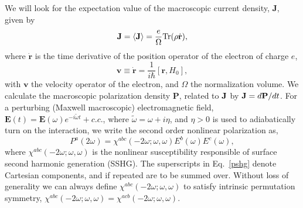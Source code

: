 \documentclass[floatfix,prb,aps,superscriptaddress,11pt,preprint,letterpaper]{revtex4}
\begin{document}
We will look for the expectation value of the macroscopic current density, 
$\mathbf{J}$, given by 
\begin{equation}
\mathbf{J}=\langle{\mathbf{J}}\rangle=\frac{e}{\Omega}\mbox{Tr}({\rho}\dot{\mathbf{r}})
,
\label{pe}
\end{equation}
where $\dot{\mathbf{r}}$ is the time derivative of the position operator of the
electron of charge $e$, 
\begin{equation}
\mathbf{v}\equiv \dot{\mathbf{r}}=\frac{1}{i\hbar }[\mathbf{r},H_0],  
\label{mv}
\end{equation}
with $\mathbf{v}$ the velocity operator of the electron, and $\Omega$ the
normalization volume. We calculate the macroscopic polarization density 
$\mathbf{P}$, related to $\mathbf{J}$ by
$\mathbf{J}=d\mathbf{P}/dt$. For a 
perturbing (Maxwell macroscopic) electromagnetic field, $\mathbf{E}(t)=
\mathbf{E}(\omega )e^{-i\tilde{\omega} t}+c.c.$,
where $\tilde\omega=\omega+i\eta $,
and $\eta >0$ is used to adiabatically turn on the interaction,
we write the second order nonlinear
polarization as, 
\begin{equation}
P^a(2\omega)=\chi ^{abc}(-2\omega;\omega,\omega)E^{b}(\omega)E^{c}(\omega),  
\label{pshg}
\end{equation}
where $\chi^{abc}(-2\omega ;\omega ,\omega )$ is the nonlinear
susceptibility responsible of surface second harmonic generation
(SSHG). 
The 
superscripts in Eq.~\eqref{pshg} denote Cartesian components, and if
repeated are to be summed over. Without loss of generality we can always
define $\chi^{abc}(-2\omega;\omega,\omega)$
 to satisfy intrinsic permutation
symmetry, 
$\chi^{abc}(-2\omega ;\omega ,\omega )=\chi ^{acb}(-2\omega ;\omega
,\omega )$.
\end{document}
